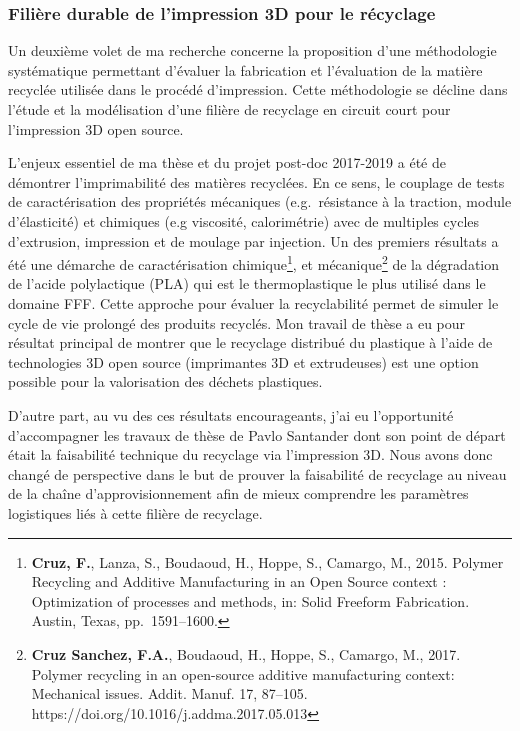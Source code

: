 \documentclass[
  11pt,
]{article}
\begin{document}
\hypertarget{filiuxe8re-durable-de-limpression-3d-pour-le-ruxe9cyclage}{%
\subsubsection{Filière durable de l'impression 3D pour le
récyclage}\label{filiuxe8re-durable-de-limpression-3d-pour-le-ruxe9cyclage}}

Un deuxième volet de ma recherche concerne la proposition d'une
méthodologie systématique permettant d'évaluer la fabrication et
l'évaluation de la matière recyclée utilisée dans le procédé
d'impression. Cette méthodologie se décline dans l'étude et la
modélisation d'une filière de recyclage en circuit court pour
l'impression 3D open source.

L'enjeux essentiel de ma thèse et du projet post-doc 2017-2019 a été de
démontrer l'imprimabilité des matières recyclées. En ce sens, le
couplage de tests de caractérisation des propriétés mécaniques
(e.g.~résistance à la traction, module d'élasticité) et chimiques (e.g
viscosité, calorimétrie) avec de multiples cycles d'extrusion,
impression et de moulage par injection. Un des premiers résultats a été
une démarche de caractérisation chimique\footnote{\textbf{Cruz, F.},
  Lanza, S., Boudaoud, H., Hoppe, S., Camargo, M., 2015. Polymer
  Recycling and Additive Manufacturing in an Open Source context :
  Optimization of processes and methods, in: Solid Freeform Fabrication.
  Austin, Texas, pp.~1591--1600.}, et mécanique\footnote{\textbf{Cruz
  Sanchez, F.A.}, Boudaoud, H., Hoppe, S., Camargo, M., 2017. Polymer
  recycling in an open-source additive manufacturing context: Mechanical
  issues. Addit. Manuf. 17, 87--105.
  https://doi.org/10.1016/j.addma.2017.05.013} de la dégradation de
l'acide polylactique (PLA) qui est le thermoplastique le plus utilisé
dans le domaine FFF. Cette approche pour évaluer la recyclabilité permet
de simuler le cycle de vie prolongé des produits recyclés. Mon travail
de thèse a eu pour résultat principal de montrer que le recyclage
distribué du plastique à l'aide de technologies 3D open source
(imprimantes 3D et extrudeuses) est une option possible pour la
valorisation des déchets plastiques.

D'autre part, au vu des ces résultats encourageants, j'ai eu
l'opportunité d'accompagner les travaux de thèse de Pavlo Santander dont
son point de départ était la faisabilité technique du recyclage via
l'impression 3D. Nous avons donc changé de perspective dans le but de
prouver la faisabilité de recyclage au niveau de la chaîne
d'approvisionnement afin de mieux comprendre les paramètres logistiques
liés à cette filière de recyclage.
\end{document}
